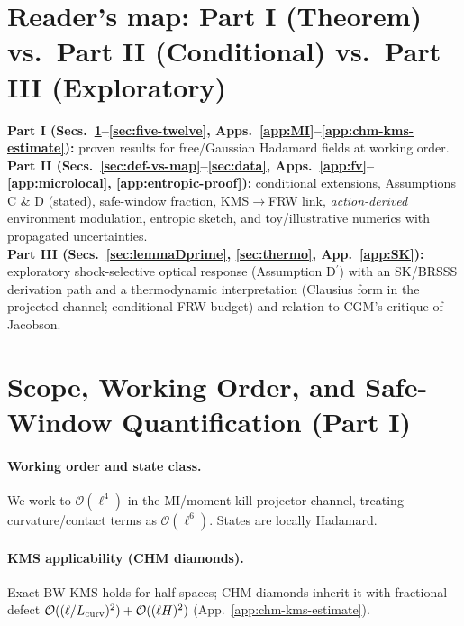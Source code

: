\documentclass[aps,prd,onecolumn,superscriptaddress,nofootinbib]{revtex4-2}
\begin{document}
\maketitle

\section*{Reader’s map: Part I (Theorem) vs.\ Part II (Conditional) vs.\ Part III (Exploratory)}
\noindent \textbf{Part I (Secs.~\ref{sec:scope}–\ref{sec:five-twelve}, Apps.~\ref{app:MI}–\ref{app:chm-kms-estimate}):} proven results for free/Gaussian Hadamard fields at working order.\\
\textbf{Part II (Secs.~\ref{sec:def-vs-map}–\ref{sec:data}, Apps.~\ref{app:fv}–\ref{app:microlocal}, \ref{app:entropic-proof}):} conditional extensions, Assumptions C \& D (stated), safe-window fraction, KMS\(\to\)FRW link, \emph{action-derived} environment modulation, entropic sketch, and toy/illustrative numerics with propagated uncertainties.\\
\textbf{Part III (Secs.~\ref{sec:lemmaDprime}, \ref{sec:thermo}, App.~\ref{app:SK}):} exploratory shock-selective optical response (Assumption D\(^{\prime}\)) with an SK/BRSSS derivation path and a thermodynamic interpretation (Clausius form in the projected channel; conditional FRW budget) and relation to CGM’s critique of Jacobson.

\section{Scope, Working Order, and Safe-Window Quantification (Part I)}
\label{sec:scope}

\paragraph{Working order and state class.} We work to \(\mathcal O(\ell^4)\) in the MI/moment-kill projector channel, treating curvature/contact terms as \(\mathcal O(\ell^6)\). States are locally Hadamard.

\paragraph{KMS applicability (CHM diamonds).} Exact BW KMS holds for half-spaces; CHM diamonds inherit it with fractional defect \(\mathcal O((\ell/L_{\rm curv})^2)+\mathcal O((\ell H)^2)\) (App.~\ref{app:chm-kms-estimate}).
\end{document}
